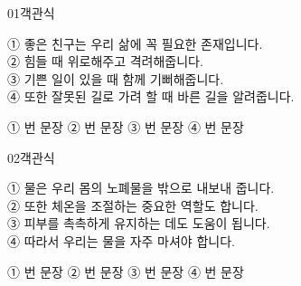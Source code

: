 \documentclass[fs12,seriesSau]{korfarm-base}
\begin{document}
\begin{kfQBlock}{01}{객관식}
\begin{kfEvidence}① 좋은 친구는 우리 삶에 꼭 필요한 존재입니다.  \\\relax
 ② 힘들 때 위로해주고 격려해줍니다.  \\\relax
 ③ 기쁜 일이 있을 때 함께 기뻐해줍니다.  \\\relax
④ 또한 잘못된 길로 가려 할 때 바른 길을 알려줍니다.\end{kfEvidence}
\begin{kfChoices}
\kfChoice ① 번 문장
\kfChoice ② 번 문장
\kfChoice ③ 번 문장
\kfChoice ④ 번 문장
\end{kfChoices}
\end{kfQBlock}
\begin{kfQBlock}{02}{객관식}
\begin{kfEvidence}① 물은 우리 몸의 노폐물을 밖으로 내보내 줍니다.  \\\relax
 ② 또한 체온을 조절하는 중요한 역할도 합니다.  \\\relax
 ③ 피부를 촉촉하게 유지하는 데도 도움이 됩니다.  \\\relax
④ 따라서 우리는 물을 자주 마셔야 합니다.\end{kfEvidence}
\begin{kfChoices}
\kfChoice ① 번 문장
\kfChoice ② 번 문장
\kfChoice ③ 번 문장
\kfChoice ④ 번 문장
\end{kfChoices}
\end{kfQBlock}




\end{document}

